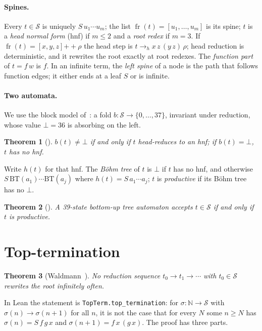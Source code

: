 \documentclass[11pt]{amsart}
\newtheorem{theorem}{Theorem}
\theoremstyle{definition}
\theoremstyle{remark}
\newcommand{\spine}{\operatorname{fr}}
\newcommand{\lean}[1]{\texttt{#1}}
\newcommand{\app}{\mathbin{+\!\!+}}
\newcommand{\hred}{\to_{h}}
\newcommand{\Ter}{\mathcal S}
\begin{document}
\paragraph{Spines.} Every $t\in\Ter$ is uniquely $S\,u_1\cdots u_m$; the list
$\spine(t)=[u_1,\dots,u_m]$ is its spine; $t$ is a \emph{head normal form} (hnf) if
$m\le2$ and a \emph{root redex} if $m=3$. If $\spine(t)=[x,y,z]\app\rho$ the head step
is $t\hred x\,z\,(y\,z)\,\rho$; head reduction is deterministic, and it rewrites the root
exactly at root redexes. The \emph{function part} of $t=f\,w$ is $f$. In an infinite term, the
\emph{left spine} of a node is the path that follows function edges; it either ends at a leaf
$S$ or is infinite.

\paragraph{Two automata.} We use the block model of~\citep{s1}: a fold $b\colon\Ter\to
\{0,\dots,37\}$, invariant under reduction, whose value $\bot=36$ is absorbing on the left.

\begin{theorem}[\citep{s1}]\label{thm:s1}
$b(t)\ne\bot$ if and only if $t$ head-reduces to an hnf; if $b(t)=\bot$, $t$ has no hnf.
\end{theorem}

\noindent Write $h(t)$ for that hnf. The \emph{B\"ohm tree} of $t$ is $\bot$ if $t$ has no
hnf, and otherwise $S\,\mathrm{BT}(a_1)\cdots\mathrm{BT}(a_j)$ where $h(t)=S\,a_1\cdots a_j$;
$t$ is \emph{productive} if its B\"ohm tree has no $\bot$.

\begin{theorem}[\citep{s15}]\label{thm:s15}
A 39-state bottom-up tree automaton accepts $t\in\Ter$ if and only if $t$ is productive.
\end{theorem}

\section{Top-termination}\label{sec:tt}

\begin{theorem}[Waldmann~\citep{waldmann-thesis}]\label{thm:tt}
No reduction sequence $t_0\to t_1\to\cdots$ with $t_0\in\Ter$ rewrites the root infinitely
often.
\end{theorem}

\noindent In Lean the statement is \lean{TopTerm.top\_termination}: for $\sigma\colon
\mathbb N\to\Ter$ with $\sigma(n)\to\sigma(n+1)$ for all $n$, it is not the case that for
every $N$ some $n\ge N$ has $\sigma(n)=S\,f\,g\,x$ and $\sigma(n+1)=f\,x\,(g\,x)$. The proof
has three parts.
\end{document}
